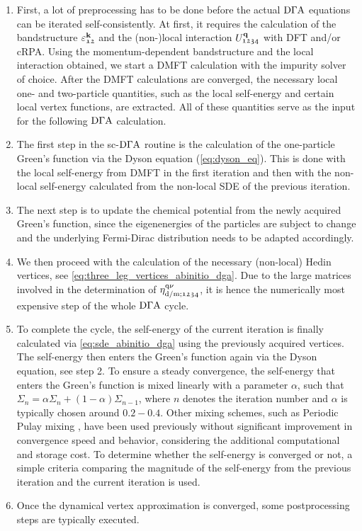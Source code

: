 \documentclass[../../main.tex]{subfiles}
\begin{document}
\begin{enumerate}
	\item First, a lot of preprocessing has to be done before the actual $\text{D}\Gamma\text{A}$ equations can be iterated self-consistently. At first, it requires the calculation of the bandstructure $\varepsilon^{\textbf{k}}_{\mathfrak{12}}$ and the (non-)local interaction $U^{\textbf{q}}_{\mathfrak{1234}}$ with DFT and/or cRPA. Using the momentum-dependent bandstructure and the local interaction obtained, we start a DMFT calculation with the impurity solver of choice. After the DMFT calculations are converged, the necessary local one- and two-particle quantities, such as the local self-energy and certain local vertex functions, are extracted. All of these quantities serve as the input for the following $\text{D}\Gamma\text{A}$ calculation.
	\item The first step in the sc-$\text{D}\Gamma\text{A}$ routine is the calculation of the one-particle Green's function via the Dyson equation (\ref{eq:dyson_eq}). This is done with the local self-energy from DMFT in the first iteration and then with the non-local self-energy calculated from the non-local SDE of the previous iteration.
	\item The next step is to update the chemical potential from the newly acquired Green’s function, since the eigenenergies of the particles are subject to change and the underlying Fermi-Dirac distribution needs to be adapted accordingly.
	\item We then proceed with the calculation of the necessary (non-local) Hedin vertices, see \eqref{eq:three_leg_vertices_abinitio_dga}. Due to the large matrices involved in the determination of $\eta^{\text{q}\nu}_{\text{d}/\text{m};\mathfrak{1234}}$, it is hence the numerically most expensive step of the whole $\text{D}\Gamma\text{A}$ cycle.
	\item To complete the cycle, the self-energy of the current iteration is finally calculated via \eqref{eq:sde_abinitio_dga} using the previously acquired vertices. The self-energy then enters the Green's function again via the Dyson equation, see step 2. To ensure a steady convergence, the self-energy that enters the Green's function is mixed linearly with a parameter $\alpha$, such that $\Sigma_n=\alpha\Sigma_n + (1-\alpha)\Sigma_{n-1}$, where $n$ denotes the iteration number and $\alpha$ is typically chosen around $0.2-0.4$. Other mixing schemes, such as Periodic Pulay mixing \cite{pulay}, have been used previously \cite{my bac thesis} without significant improvement in convergence speed and behavior, considering the additional computational and storage cost. To determine whether the self-energy is converged or not, a simple criteria comparing the magnitude of the self-energy from the previous iteration and the current iteration is used.
	\item Once the dynamical vertex approximation is converged, some postprocessing steps are typically executed.
\end{enumerate}
\end{document}
